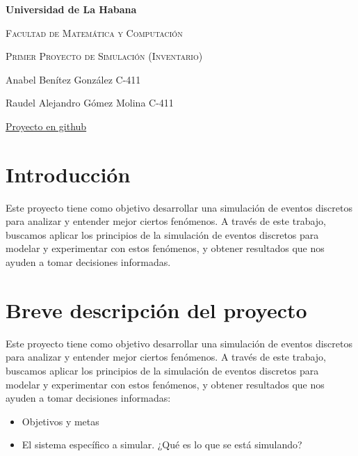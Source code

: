 \documentclass{article}
\begin{document}
\begin{titlepage}
    \centering
    {\bfseries\LARGE Universidad de La Habana \par}
    \vspace{1cm}
    {\scshape\Large Facultad de Matemática y Computación \par}
    \vspace{3cm}
    {\scshape\Huge Primer Proyecto de Simulación (Inventario) \par}
    \vfill
   
    {\Large Anabel Benítez González C-411 \par}
    {\Large Raudel Alejandro Gómez Molina C-411 \par}
    \vfill
    {\href{https://github.com/anabel02/discrete-event-simulation}{Proyecto en github} \par}
\end{titlepage}

\section*{Introducción}

Este proyecto tiene como objetivo desarrollar una simulación de eventos discretos para analizar y entender mejor ciertos
fenómenos. A través de este trabajo, buscamos aplicar los principios de la simulación de eventos discretos para modelar
y experimentar con estos fenómenos, y obtener resultados que nos ayuden a tomar decisiones informadas.


\section*{ Breve descripción del proyecto}

Este proyecto tiene como objetivo desarrollar una simulación de eventos discretos para analizar y entender mejor ciertos
fenómenos. A través de este trabajo, buscamos aplicar los principios de la simulación de eventos discretos para modelar
y experimentar con estos fenómenos, y obtener resultados que nos ayuden a tomar decisiones informadas:

\begin{itemize}
    \item Objetivos y metas
    \item El sistema específico a simular. ¿Qué es lo que se está simulando?
\end{itemize}
\end{document}
